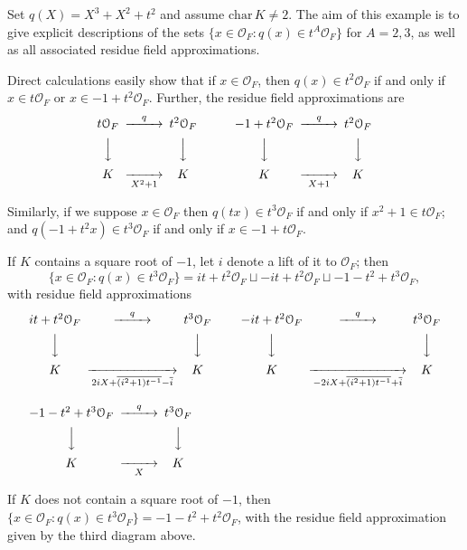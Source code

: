 \documentclass{lmsMODIFIED}
\newcommand{\roi}{\mathcal{O}}
\newcommand{\res}[1]{\overline{#1}}
\begin{document}
\begin{example}
Set $q(X)=X^3+X^2+t^2$ and assume $\mbox{char}\, K \neq 2$. The aim of this example is to give explicit descriptions of the sets $\{x\in\roi_{F}:q(x)\in t^A\roi_{F}\}$ for $A=2,3$, as well as all associated residue field approximations.

Direct calculations easily show that if $x\in\roi_{F}$, then $q(x)\in t^2\roi_{F}$ if and only if $x\in t\roi_{F}$ or $x\in-1+t^2\roi_{F}$. Further, the residue field approximations are
\begin{align*}\begin{CD}
t\roi_{F} @>q>>t^2\roi_{F} \\
@VVV  @VVV  \\
 K  @>>X^2+1>  K \\
\end{CD}
&\qquad&
\begin{CD}
-1+t^2\roi_{F} @>q>>t^2\roi_{F} \\
@VVV  @VVV  \\
 K  @>>X+1>  K \\
\end{CD}\end{align*}

Similarly, if we suppose $x\in\roi_{F}$ then $q(tx)\in t^3\roi_{F}$ if and only if $x^2+1\in t\roi_{F}$; and $q(-1+t^2x)\in t^3\roi_{F}$ if and only if $x\in-1+t\roi_{F}$.

If $ K $ contains a square root of $-1$, let $i$ denote a lift of it to $\roi_{F}$; then \[\{x\in\roi_{F}:q(x)\in t^3\roi_{F}\}=it+t^2\roi_{F}\sqcup-it+t^2\roi_{F}\sqcup-1-t^2+t^3\roi_{F},\] with residue field approximations
\[\begin{array}{lcc}
\begin{CD}
it+t^2\roi_{F} @>q>>t^3\roi_{F} \\
@VVV  @VVV  \\
 K  @>>2iX+\res{(i^2+1)t^{-1}}-\res{i}>  K 
\end{CD}
&\,\,&
\begin{CD}
-it+t^2\roi_{F} @>q>>t^3\roi_{F} \\
@VVV  @VVV  \\
 K  @>>-2iX+\res{(i^2+1)t^{-1}}+\res{i}>  K 
\end{CD}\\
&&\\
\begin{CD}
-1-t^2+t^3\roi_{F} @>q>>t^3\roi_{F} \\
@VVV  @VVV  \\
 K  @>>X>  K 
\end{CD}
&&\\
\end{array}\]

If $ K $ does not contain a square root of $-1$, then $\{x\in\roi_{F}:q(x)\in t^3\roi_{F}\}=-1-t^2+t^2\roi_{F}$, with the residue field approximation given by the third diagram above.
\end{example}
\end{document}
